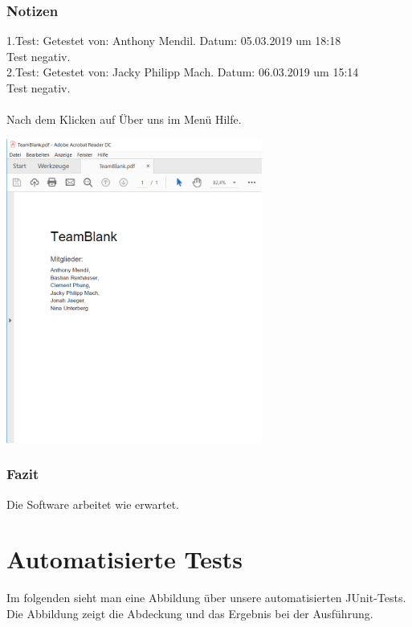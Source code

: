 \documentclass[enabledeprecatedfontcommands]{scrartcl}
\begin{document}
\subsubsection{Notizen}
1.Test: Getestet von: Anthony Mendil. Datum:  05.03.2019 um 18:18\\
Test negativ.\\
2.Test: Getestet von: Jacky Philipp Mach. Datum: 06.03.2019 um 15:14\\
Test negativ.\\\\
Nach dem Klicken auf Über uns im Menü Hilfe.
\begin{center}
\includegraphics[height=10cm]{aboutus.png}
\end{center}
\subsubsection{Fazit}
Die Software arbeitet wie erwartet.
\newpage
\section{Automatisierte Tests}
Im folgenden sieht man eine Abbildung über unsere automatisierten JUnit-Tests.
Die Abbildung zeigt die Abdeckung und das Ergebnis bei der Ausführung.
\end{document}
